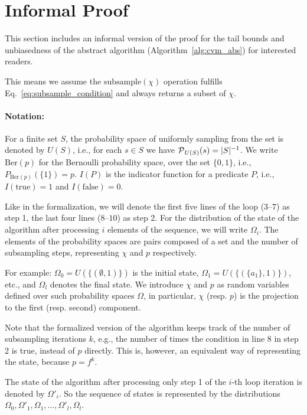\section{Informal Proof}
This section includes an informal version of the proof for the tail bounds and unbiasedness
of the abstract algorithm (Algorithm~\ref{alg:cvm_abs}) for interested readers.

This means we assume the $\mathrm{subsample}(\chi)$ operation fulfills
Eq.~\ref{eq:subsample_condition} and always returns a subset of $\chi$.

\paragraph{Notation:} For a finite set $S$, the probability space of uniformly sampling from the set
is denoted by $U(S)$, i.e., for each $s \in S$ we have $\operatorname{\mathcal P}_{U(S)}({s}) = |S|^{-1}$.
We write $\mathrm{Ber}(p)$ for the Bernoulli probability space, over the set $\{0,1\}$, i.e.,
$P_{\mathrm{Ber}(p)}(\{1\}) = p$. $I(P)$ is the indicator function for a predicate $P$, i.e.,
$I(\mathrm{true}) = 1$ and $I(\mathrm{false}) = 0$.

Like in the formalization, we will denote the first five lines of the loop ($3$--$7$) as step 1, 
the last four lines ($8$--$10$) as step 2. For the distribution of the state of the algorithm after
processing $i$ elements of the sequence, we will write $\Omega_i$.
The elements of the probability spaces are pairs composed of a set and the number of subsampling
steps, representing $\chi$ and $p$ respectively.

For example: $\Omega_0 = U(\{(\emptyset, 1)\})$ is the initial state, 
$\Omega_1 = U(\{(\{a_1\}, 1)\})$, etc., and $\Omega_l$ denotes the final state.
We introduce $\chi$ and $p$ as random variables defined over such probability spaces $\Omega$, 
in particular, $\chi$ (resp. $p$) is the projection to the first (resp. second) component.

Note that the formalized version of the algorithm keeps track of the number of
subsampling iterations $k$, e.g., the number of times the condition in line 8 in step 2 is true,
instead of $p$ directly. This is, however, an equivalent way of representing the state, because 
$p = f^k$.

The state of the algorithm after processing only step 1 of the $i$-th loop iteration is denoted by 
$\Omega'_i$. So the sequence of states is represented by the distributions 
$\Omega_0, \Omega'_1, \Omega_1, \ldots, \Omega'_l, \Omega_l$.

